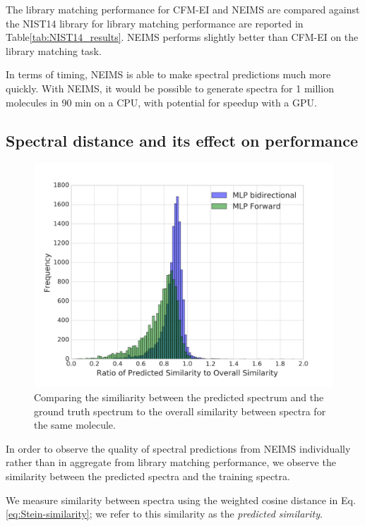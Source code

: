 \documentclass{article}
\begin{document}
The library matching performance for CFM-EI and NEIMS are compared against the NIST14 library for library matching performance are reported in Table\ref{tab:NIST14_results}. NEIMS performs slightly better than CFM-EI on the library matching task. 

In terms of timing, NEIMS is able to make spectral predictions much more quickly. With NEIMS, it would be possible to generate spectra for 1 million molecules in 90 min on a CPU, with potential for speedup with a GPU. 


\subsection{Spectral distance and its effect on performance}

\begin{figure}[h]
    \centering
    \includegraphics[scale=0.4]{./figures/predicted_similarity_overall_similarity_ratio.png}
        \caption[Similarity Analysis of NEIMS predicted spectra to spectra self-similarity]{Comparing the similiarity between the predicted spectrum and the ground truth spectrum to the overall similarity between spectra for the same molecule. }
    \label{fig:similarity_analysis}
\end{figure}

In order to observe the quality of spectral predictions from NEIMS individually rather than in aggregate from library matching performance, we observe the similarity between the predicted spectra and the training spectra.

We measure similarity between spectra using the weighted cosine distance in Eq. \ref{eq:Stein-similarity}; we refer to this similarity as the \textit{predicted similarity}.
\end{document}
